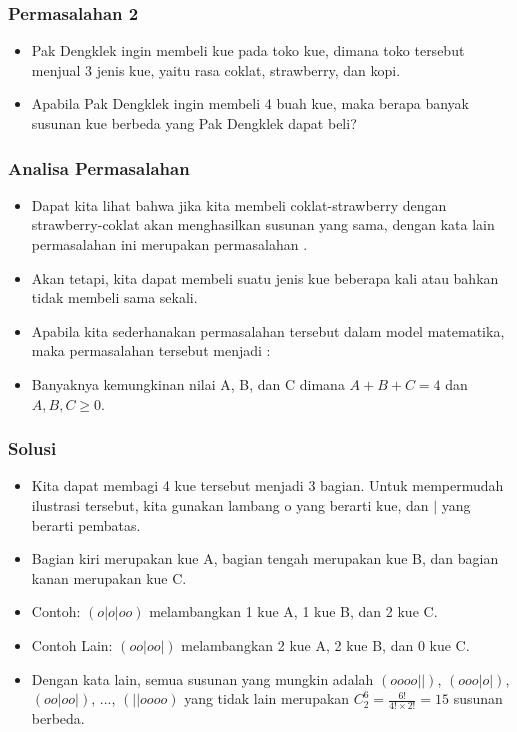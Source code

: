 \begin{frame}
\frametitle{Permasalahan 2}
\begin{itemize}
  \item Pak Dengklek ingin membeli kue pada toko kue, dimana toko tersebut menjual 3 jenis kue, yaitu rasa coklat, strawberry, dan kopi.
  \item Apabila Pak Dengklek ingin membeli 4 buah kue, maka berapa banyak susunan kue berbeda yang Pak Dengklek dapat beli?
\end{itemize}
\end{frame}

\begin{frame}
\frametitle{Analisa Permasalahan}
\begin{itemize}
  \item Dapat kita lihat bahwa jika kita membeli coklat-strawberry dengan strawberry-coklat akan menghasilkan susunan yang sama, dengan kata lain permasalahan ini merupakan permasalahan .
  \item Akan tetapi, kita dapat membeli suatu jenis kue beberapa kali atau bahkan tidak membeli sama sekali.
  \item Apabila kita sederhanakan permasalahan tersebut dalam model matematika, maka permasalahan tersebut menjadi :
  \item Banyaknya kemungkinan nilai A, B, dan C dimana $A + B + C = 4$ dan $A,B,C \geq 0$.
\end{itemize}
\end{frame}

\begin{frame}
\frametitle{Solusi}
\begin{itemize}
  \item Kita dapat membagi 4 kue tersebut menjadi 3 bagian. Untuk mempermudah ilustrasi tersebut, kita gunakan lambang o yang berarti kue, dan $|$ yang berarti pembatas.
  \item Bagian kiri merupakan kue A, bagian tengah merupakan kue B, dan bagian kanan merupakan kue C.
  \item Contoh: $(o|o|oo)$ melambangkan 1 kue A, 1 kue B, dan 2 kue C.
  \item Contoh Lain: $(oo|oo|)$ melambangkan 2 kue A, 2 kue B, dan 0 kue C.
  \item Dengan kata lain, semua susunan yang mungkin adalah $(oooo||)$, $(ooo|o|)$, $(oo|oo|)$, ..., $(||oooo)$ yang tidak lain merupakan $C^{6}_{2} = \frac{6!}{4! \times 2!} = 15$ susunan berbeda.
\end{itemize}
\end{frame}


